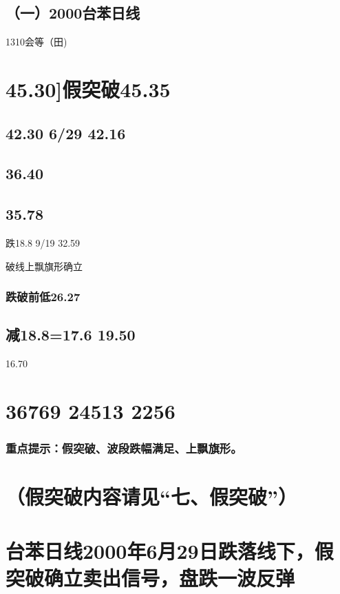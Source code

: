 \documentclass{article}
\begin{document}
\subsection{（一）2000台苯日线}

1310会等（田)

\section{45.30]假突破45.35}

\subsection{42.30 6/29 42.16}

\subsection{36.40}

\subsection{35.78}

跌18.8 9/19 32.59

破线上飘旗形确立

\subsubsection{跌破前低26.27}

\subsection{减18.8=17.6 19.50}

16.70

\section{36769 24513 2256}

\subsubsection{重点提示：假突破、波段跌幅满足、上飘旗形。}

\section{（假突破内容请见“七、假突破”）}

\section{台苯日线2000年6月29日跌落线下，假突破确立卖出信号，盘跌一波反弹}
\end{document}
